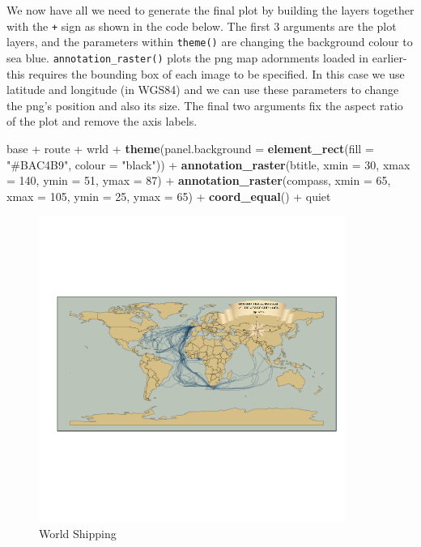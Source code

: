 \documentclass[]{article}
\newenvironment{Shaded}{}{}
\newcommand{\KeywordTok}[1]{\textcolor[rgb]{0.00,0.44,0.13}{\textbf{{#1}}}}
\newcommand{\DataTypeTok}[1]{\textcolor[rgb]{0.56,0.13,0.00}{{#1}}}
\newcommand{\DecValTok}[1]{\textcolor[rgb]{0.25,0.63,0.44}{{#1}}}
\newcommand{\StringTok}[1]{\textcolor[rgb]{0.25,0.44,0.63}{{#1}}}
\newcommand{\NormalTok}[1]{{#1}}
\let\Oldincludegraphics\includegraphics
\renewcommand{\includegraphics}[1]{\Oldincludegraphics[width=10cm]{#1}}
\providecommand{\DIFaddend}{} %
\begin{document}
\DIFaddend We now have all we need to generate the final plot by building the
layers together with the \texttt{+} sign as shown in the code below. The
first 3 arguments are the plot layers, and the parameters within
\texttt{theme()} are changing the background colour to sea blue.
\texttt{annotation\_raster()} plots the png map adornments loaded in
earlier- this requires the bounding box of each image to be specified.
In this case we use latitude and longitude (in WGS84) and we can use
these parameters to change the png's position and also its size. The
final two arguments fix the aspect ratio of the plot and remove the axis
labels.

\begin{Shaded}
\begin{Highlighting}[]
\NormalTok{base + route + wrld + }\KeywordTok{theme}\NormalTok{(}\DataTypeTok{panel.background =} \KeywordTok{element_rect}\NormalTok{(}\DataTypeTok{fill =} \StringTok{"#BAC4B9"}\NormalTok{, }
    \DataTypeTok{colour =} \StringTok{"black"}\NormalTok{)) + }\KeywordTok{annotation_raster}\NormalTok{(btitle, }\DataTypeTok{xmin =} \DecValTok{30}\NormalTok{, }\DataTypeTok{xmax =} \DecValTok{140}\NormalTok{, }\DataTypeTok{ymin =} \DecValTok{51}\NormalTok{, }
    \DataTypeTok{ymax =} \DecValTok{87}\NormalTok{) + }\KeywordTok{annotation_raster}\NormalTok{(compass, }\DataTypeTok{xmin =} \DecValTok{65}\NormalTok{, }\DataTypeTok{xmax =} \DecValTok{105}\NormalTok{, }\DataTypeTok{ymin =} \DecValTok{25}\NormalTok{, }
    \DataTypeTok{ymax =} \DecValTok{65}\NormalTok{) + }\KeywordTok{coord_equal}\NormalTok{() + quiet}
\end{Highlighting}
\end{Shaded}
\begin{figure}[htbp]
\centering
\includegraphics{figure/World_Shipping.png}
\caption{World Shipping}
\end{figure}
\end{document}
